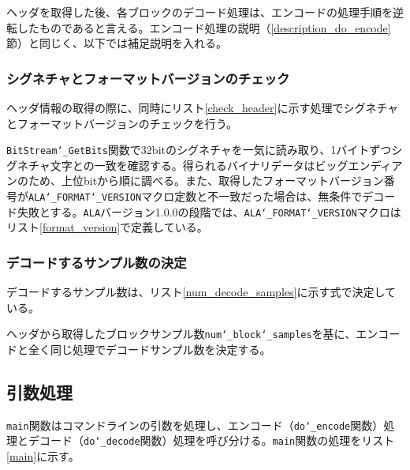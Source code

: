 \documentclass[uplatex,dvipdfmx,b5j,10pt]{jsbook}
\theoremstyle{definition}
\begin{document}
ヘッダを取得した後、各ブロックのデコード処理は、エンコードの処理手順を逆転したものであると言える。エンコード処理の説明（\ref{description_do_encode}節）と同じく、以下では補足説明を入れる。

\subsubsection{シグネチャとフォーマットバージョンのチェック}

ヘッダ情報の取得の際に、同時にリスト\ref{check_header}に示す処理でシグネチャとフォーマットバージョンのチェックを行う。



\texttt{BitStream\char`_GetBits}関数で32bitのシグネチャを一気に読み取り、1バイトずつシグネチャ文字との一致を確認する。得られるバイナリデータはビッグエンディアンのため、上位bitから順に調べる。また、取得したフォーマットバージョン番号が\texttt{ALA\char`_FORMAT\char`_VERSION}マクロ定数と不一致だった場合は、無条件でデコード失敗とする。\texttt{ALA}バージョン1.0.0の段階では、\texttt{ALA\char`_FORMAT\char`_VERSION}マクロはリスト\ref{format_version}で定義している。



\subsubsection{デコードするサンプル数の決定}

デコードするサンプル数は、リスト\ref{num_decode_samples}に示す式で決定している。


ヘッダから取得したブロックサンプル数\texttt{num\char`_block\char`_samples}を基に、エンコードと全く同じ処理でデコードサンプル数を決定する。

\subsection{引数処理}

\texttt{main}関数はコマンドラインの引数を処理し、エンコード（\texttt{do\char`_encode}関数）処理とデコード（\texttt{do\char`_decode}関数）処理を呼び分ける。\texttt{main}関数の処理をリスト\ref{main}に示す。

\end{document}
